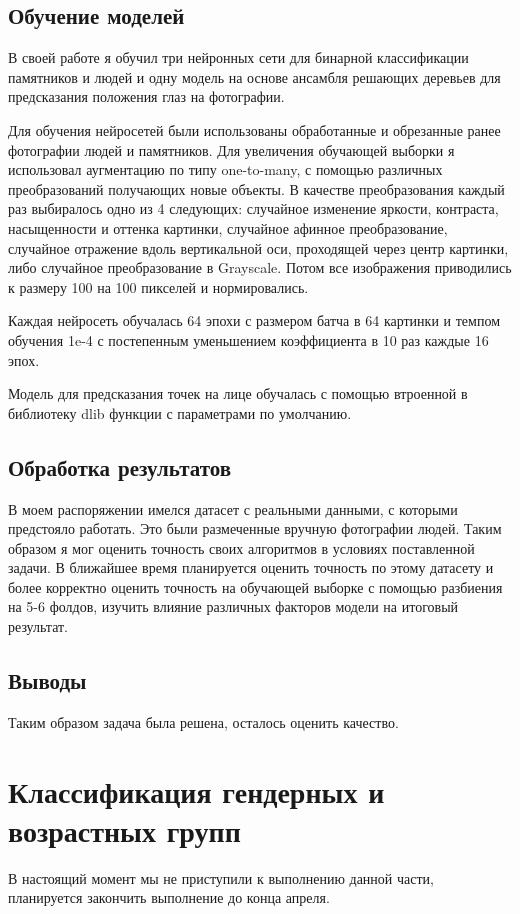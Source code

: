 \documentclass[a4paper,14pt]{extarticle}
\begin{document}
    \subsection{Обучение моделей}
    \par В своей работе я обучил три нейронных сети для бинарной классификации памятников и людей и одну модель на основе ансамбля решающих деревьев для предсказания положения глаз на фотографии.
    \par Для обучения нейросетей были использованы обработанные и обрезанные ранее фотографии людей и памятников. Для увеличения обучающей выборки я использовал аугментацию по типу one-to-many, с помощью различных преобразований получающих новые объекты. В качестве преобразования каждый раз выбиралось одно из 4 следующих: случайное изменение яркости, контраста, насыщенности и оттенка картинки, случайное афинное преобразование, случайное отражение вдоль вертикальной оси, проходящей через центр картинки, либо случайное преобразование в Grayscale. Потом все изображения приводились к размеру 100 на 100 пикселей и нормировались.
    \par Каждая нейросеть обучалась 64 эпохи с размером батча в 64 картинки и темпом обучения 1e-4 с постепенным уменьшением коэффициента в 10 раз каждые 16 эпох.
    \par Модель для предсказания точек на лице обучалась с помощью втроенной в библиотеку dlib функции с параметрами по умолчанию.

    \subsection{Обработка результатов}
    В моем распоряжении имелся датасет с реальными данными, с которыми предстояло работать. Это были размеченные вручную фотографии людей. Таким образом я мог оценить точность своих алгоритмов в условиях поставленной задачи. В ближайшее время планируется оценить точность по этому датасету и более корректно оценить точность на обучающей выборке с помощью разбиения на 5-6 фолдов, изучить влияние различных факторов модели на итоговый результат.

    \subsection{Выводы}
    Таким образом задача была решена, осталось оценить качество.
    \newpage

    \section{Классификация гендерных и возрастных групп}
    В настоящий момент мы не приступили к выполнению данной части, планируется закончить выполнение до конца апреля.
    \newpage
\end{document}
